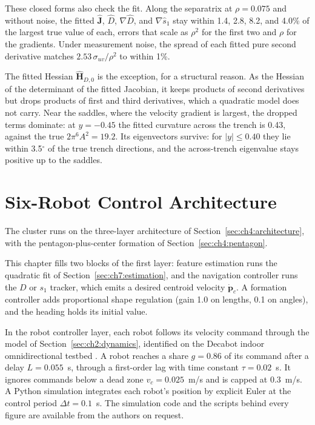 These closed forms also check the fit. Along the separatrix at
$\rho = 0.075$ and without noise, the fitted $\hat{\mathbf{J}}$, $\hat{D}$,
$\nabla\hat{D}$, and $\nabla\hat{s}_1$ stay within 1.4,
2.8, 8.2, and 4.0\% of the largest true value of each,
errors that scale as $\rho^2$ for the first two and $\rho$ for the
gradients. Under measurement noise, the spread of each fitted pure second
derivative matches $2.53\,\sigma_{uv}/\rho^2$ to within 1\%.

The fitted Hessian $\hat{\mathbf{H}}_{D,0}$ is the exception, for a
structural reason. As the Hessian of the determinant of the fitted
Jacobian, it keeps products of second derivatives but drops products of
first and third derivatives, which a quadratic model does not carry. Near
the saddles, where the velocity gradient is largest, the dropped terms
dominate: at $y = -0.45$ the fitted curvature across the trench is
0.43, against the true $2\pi^6 A^2 = 19.2$. Its eigenvectors
survive: for $|y| \leq 0.40$ they lie within 3.5$^\circ$ of the true
trench directions, and the across-trench eigenvalue stays positive up to
the saddles.

\section{Six-Robot Control Architecture}
\label{sec:ch7:architecture}

The cluster runs on the three-layer architecture of
Section~\ref{sec:ch4:architecture}, with the pentagon-plus-center
formation of Section~\ref{sec:ch4:pentagon}.

This chapter fills two blocks of the first layer:
feature estimation runs the quadratic fit of Section~\ref{sec:ch7:estimation}, and the
navigation controller runs the $D$ or $s_1$ tracker, which emits a desired
centroid velocity $\dot{\mathbf{p}}_c$. A formation controller adds
proportional shape regulation (gain 1.0 on lengths, 0.1 on angles), and
the heading holds its initial value.

In the robot controller layer, each robot follows its velocity command
through the model of Section~\ref{sec:ch2:dynamics}, identified on the Decabot indoor
omnidirectional testbed \cite{42,30}. A robot reaches a share
$g = 0.86$ of its command after a delay $L = 0.055$~s, through
a first-order lag with time constant $\tau = 0.02$~s. It ignores
commands below a dead zone $v_c = 0.025$~m/s and is capped at 0.3~m/s. A
Python simulation integrates each robot's position by explicit Euler at the
control period $\Delta t = 0.1$~s. The simulation code and the scripts
behind every figure are available from the authors on request.

